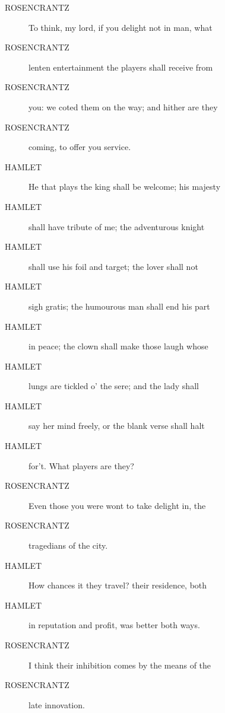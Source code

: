 \documentclass{article}
\begin{document}
\begin{description}
            
\item[ROSENCRANTZ] To think, my lord, if you delight not in man, what
\item[ROSENCRANTZ] lenten entertainment the players shall receive from
\item[ROSENCRANTZ] you: we coted them on the way; and hither are they
\item[ROSENCRANTZ] coming, to offer you service.
\end{description}
          
\begin{description}
            
\item[HAMLET] He that plays the king shall be welcome; his majesty
\item[HAMLET] shall have tribute of me; the adventurous knight
\item[HAMLET] shall use his foil and target; the lover shall not
\item[HAMLET] sigh gratis; the humourous man shall end his part
\item[HAMLET] in peace; the clown shall make those laugh whose
\item[HAMLET] lungs are tickled o' the sere; and the lady shall
\item[HAMLET] say her mind freely, or the blank verse shall halt
\item[HAMLET] for't. What players are they?
\end{description}
          
\begin{description}
            
\item[ROSENCRANTZ] Even those you were wont to take delight in, the
\item[ROSENCRANTZ] tragedians of the city.
\end{description}
          
\begin{description}
            
\item[HAMLET] How chances it they travel? their residence, both
\item[HAMLET] in reputation and profit, was better both ways.
\end{description}
          
\begin{description}
            
\item[ROSENCRANTZ] I think their inhibition comes by the means of the
\item[ROSENCRANTZ] late innovation.
\end{description}
          
\end{document}
